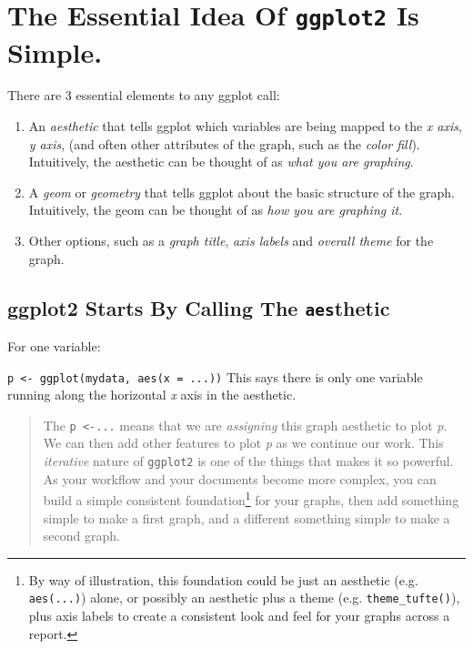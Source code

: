 \documentclass[12pt,]{article}
\providecommand{\tightlist}{%
  \setlength{\itemsep}{0pt}\setlength{\parskip}{0pt}}
\begin{document}
\hypertarget{the-essential-idea-of-ggplot2-is-simple.}{%
\section{\texorpdfstring{The Essential Idea Of \texttt{ggplot2} Is
Simple.}{The Essential Idea Of ggplot2 Is Simple.}}\label{the-essential-idea-of-ggplot2-is-simple.}}

There are 3 essential elements to any ggplot call:

\begin{enumerate}
\def\labelenumi{\arabic{enumi}.}
\tightlist
\item
  An \emph{aesthetic} that tells ggplot which variables are being mapped
  to the \emph{x axis}, \emph{y axis}, (and often other attributes of
  the graph, such as the \emph{color fill}). Intuitively, the aesthetic
  can be thought of as \emph{what you are graphing}.
\item
  A \emph{geom} or \emph{geometry} that tells ggplot about the basic
  structure of the graph. Intuitively, the geom can be thought of as
  \emph{how you are graphing it}.
\item
  Other options, such as a \emph{graph title}, \emph{axis labels} and
  \emph{overall theme} for the graph.
\end{enumerate}

\hypertarget{ggplot2-starts-by-calling-the-aesthetic}{%
\subsection{\texorpdfstring{ggplot2 Starts By Calling The
\texttt{aes}thetic}{ggplot2 Starts By Calling The aesthetic}}\label{ggplot2-starts-by-calling-the-aesthetic}}

For one variable:

\texttt{p\ \textless{}-\ ggplot(mydata,\ aes(x\ =\ ...))} This says
there is only one variable running along the horizontal \emph{x} axis in
the aesthetic.

\begin{quote}
The \texttt{p\ \textless{}-...} means that we are \emph{assigning} this
graph aesthetic to plot \emph{p}. We can then add other features to plot
\emph{p} as we continue our work. This \emph{iterative} nature of
\texttt{ggplot2} is one of the things that makes it so powerful. As your
workflow and your documents become more complex, you can build a simple
consistent foundation\footnote{By way of illustration, this foundation
  could be just an aesthetic (e.g. \texttt{aes(...)}) alone, or possibly
  an aesthetic plus a theme (e.g. \texttt{theme\_tufte()}), plus axis
  labels to create a consistent look and feel for your graphs across a
  report.} for your graphs, then add something simple to make a first
graph, and a different something simple to make a second graph.
\end{quote}
\end{document}
